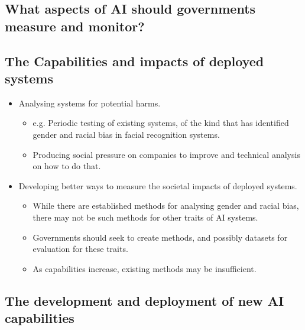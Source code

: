 \documentclass{article}
\begin{document}
\begin{multicols}{2}
\section{What aspects of AI should governments measure and monitor?}

\subsection{The Capabilities and impacts of deployed systems}

\begin{itemize}
\item Analysing systems for potential harms.
	\begin{itemize}
	\item e.g. Periodic testing of existing systems, of the kind that has identified gender and racial bias in facial recognition systems.
	\item Producing social pressure on companies to improve and technical analysis on how to do that.
    \end{itemize}
\item Developing better ways to measure the societal impacts of deployed systems.
    \begin{itemize}
    \item While there are established methods for analysing gender and racial bias, there may not be such methods for other traits of AI systems.
    \item Governments should seek to create methods, and possibly datasets for evaluation for these traits.
    \item As capabilities increase, existing methods may be insufficient.
    \end{itemize}
\end{itemize}

\subsection{The development and deployment of new AI capabilities}


\end{multicols}
\end{document}
